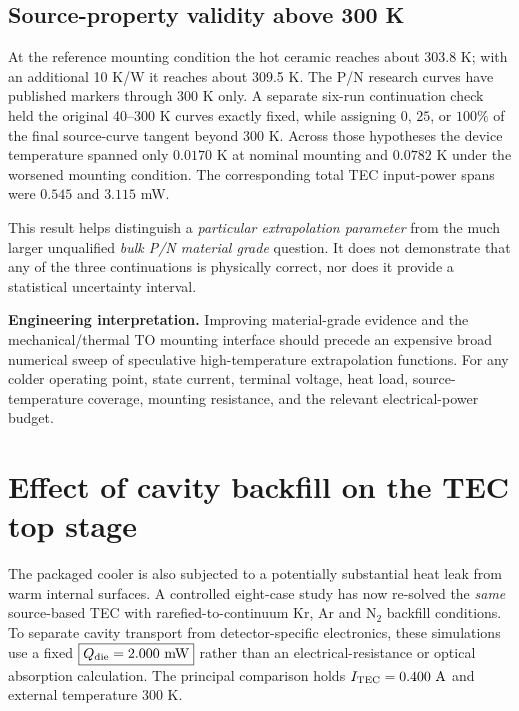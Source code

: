 \subsection{Source-property validity above 300 K}
At the reference mounting condition the hot ceramic reaches about
303.8 K; with an additional 10 K/W it reaches about 309.5 K. The P/N
research curves have published markers through 300 K only. A separate
six-run continuation check held the original 40--300 K curves exactly fixed,
while assigning \(0\), \(25\), or \(100\%\) of the final source-curve
tangent beyond 300 K. Across those hypotheses the device temperature
spanned only \(0.0170\) K at nominal mounting and \(0.0782\) K under
the worsened mounting condition. The corresponding total TEC input-power
spans were \(0.545\) and \(3.115\) mW.

This result helps distinguish a \emph{particular extrapolation parameter}
from the much larger unqualified \emph{bulk P/N material grade} question.
It does not demonstrate that any of the three continuations is physically
correct, nor does it provide a statistical uncertainty interval.

\textbf{Engineering interpretation.}
Improving material-grade evidence and the mechanical/thermal TO mounting
interface should precede an expensive broad numerical sweep of speculative
high-temperature extrapolation functions. For any colder operating point,
state current, terminal voltage, heat load, source-temperature coverage,
mounting resistance, and the relevant electrical-power budget.

\clearpage
\section{Effect of cavity backfill on the TEC top stage}
\label{sec:package-backfill-current}
The packaged cooler is also subjected to a potentially substantial heat
leak from warm internal surfaces. A controlled eight-case study has now
re-solved the \emph{same} source-based TEC with rarefied-to-continuum
Kr, Ar and N$_2$ backfill conditions. To separate cavity transport from
detector-specific electronics, these simulations use a fixed
\(\boxed{Q_{\rm die}=2.000\ {\rm mW}}\) rather than an
electrical-resistance or optical absorption calculation.
The principal comparison holds
\(I_{\rm TEC}=0.400\ {\rm A}\) and external temperature 300 K.

